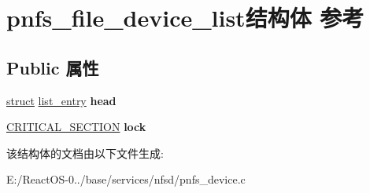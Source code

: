 \hypertarget{structpnfs__file__device__list}{}\section{pnfs\+\_\+file\+\_\+device\+\_\+list结构体 参考}
\label{structpnfs__file__device__list}
\subsection*{Public 属性}
\begin{DoxyCompactItemize}
\item 
\mbox{\label{structpnfs__file__device__list_a3da6581b287172498e53c06b8bb519ca}} 
\hyperlink{interfacestruct}{struct} \hyperlink{structlist__entry}{list\+\_\+entry} {\bfseries head}
\item 
\mbox{\label{structpnfs__file__device__list_a466e79b8426bf9e7a2b1caf8b2460b3c}} 
\hyperlink{struct___c_r_i_t_i_c_a_l___s_e_c_t_i_o_n}{C\+R\+I\+T\+I\+C\+A\+L\+\_\+\+S\+E\+C\+T\+I\+ON} {\bfseries lock}
\end{DoxyCompactItemize}


该结构体的文档由以下文件生成\+:\begin{DoxyCompactItemize}
\item 
E\+:/\+React\+O\+S-\/0../base/services/nfsd/pnfs\+\_\+device.\+c\end{DoxyCompactItemize}
